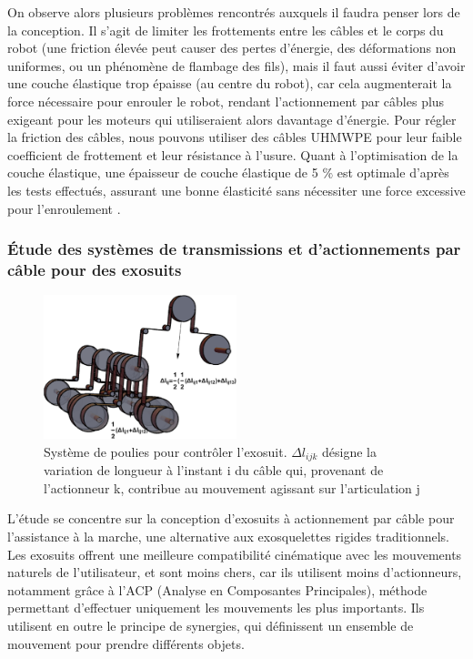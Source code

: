 \documentclass[a4paper, 11pt]{report}
\begin{document}
            On observe alors plusieurs problèmes rencontrés auxquels il faudra penser lors de la conception. Il s'agit de limiter les frottements entre les câbles et le corps du robot (une friction élevée peut causer des pertes d'énergie, des déformations non uniformes, ou un phénomène de flambage des fils), mais il faut aussi éviter d'avoir une couche élastique trop épaisse (au centre du robot), car cela augmenterait la force nécessaire pour enrouler le robot, rendant l'actionnement par câbles plus exigeant pour les moteurs qui utiliseraient alors davantage d'énergie. Pour régler la friction des câbles, nous pouvons utiliser des câbles UHMWPE pour leur faible coefficient de frottement et leur résistance à l'usure. Quant à l'optimisation de la couche élastique, une épaisseur de couche élastique de 5 $\%$ est optimale d'après les tests effectués, assurant une bonne élasticité sans nécessiter une force excessive pour l'enroulement \cite{wang_spirobs_2025}.

        \subsubsection{Étude des systèmes de transmissions et d'actionnements par câble pour des exosuits}

            \begin{figure}
                \centering
                \includegraphics[width=0.5\textwidth]{Figures/poulies.jpg}
                \caption{Système de poulies pour contrôler l'exosuit. $\Delta l_{ijk}$ désigne la variation de longueur à l'instant i du câble qui, provenant de l'actionneur k, contribue au mouvement agissant sur l'articulation j \cite{daniel_rodriguez-jorge_transmission_2023}}
                \label{fig:poulies}
            \end{figure}

            L'étude \cite{daniel_rodriguez-jorge_transmission_2023} se concentre sur la conception d'exosuits à actionnement par câble pour l'assistance à la marche, une alternative aux exosquelettes rigides traditionnels. Les exosuits offrent une meilleure compatibilité cinématique avec les mouvements naturels de l'utilisateur, et sont moins chers, car ils utilisent moins d'actionneurs, notamment grâce à l'ACP (Analyse en Composantes Principales), méthode permettant d'effectuer uniquement les mouvements les plus importants. Ils utilisent en outre le principe de synergies, qui définissent un ensemble de mouvement pour prendre différents objets.
\end{document}
